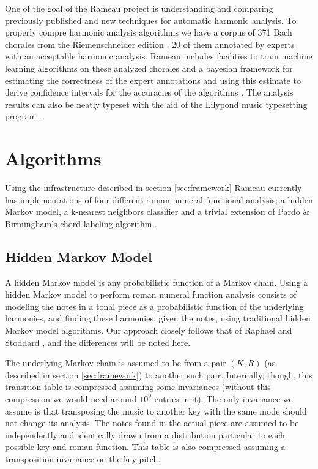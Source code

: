 
One of the goal of the Rameau project is understanding and comparing
previously published and new techniques for automatic harmonic
analysis. To properly compre harmonic analysis algorithms we have a
corpus of 371 Bach chorales from the Riemenschneider edition
\cite{bach41:371}, 20 of them annotated by experts with an acceptable
harmonic analysis. Rameau includes facilities to train machine
learning algorithms on these analyzed chorales and a bayesian
framework for estimating the correctness of the expert annotations and
using this estimate to derive confidence intervals for the accuracies
of the algorithms . The analysis results can
also be neatly typeset with the aid of the Lilypond music typesetting
program \cite{nienhuys.ea08:lilypond}.

\section{Algorithms}
\label{sec:algorithms}

Using the infrastructure described in section \ref{sec:framework}
Rameau currently has implementations of four different roman numeral
functional analysis; a hidden Markov model, a k-nearest neighbors
classifier and a trivial extension of Pardo \& Birmingham's chord
labeling algorithm \cite{pardo.ea99:automated}.

\subsection{Hidden Markov Model}
\label{sec:hidden-markov-model}

A hidden Markov model is any probabilistic function of a Markov
chain. Using a hidden Markov model to perform roman numeral function
analysis consists of modeling the notes in a tonal piece as a
probabilistic function of the underlying harmonies, and finding these
harmonies, given the notes, using traditional hidden Markov model
algorithms. Our approach closely follows that of Raphael and Stoddard
\cite{raphael.ea03:harmonic}, and the differences will be noted here.

The underlying Markov chain is assumed to be from a pair $(K,R)$ (as
described in section \ref{sec:framework}) to another such
pair. Internally, though, this transition table is compressed assuming
some invariances (without this compression we would need around $10^9$
entries in it). The only invariance we assume is that transposing the
music to another key with the same mode should not change its
analysis. The notes found in the actual piece are assumed to be
independently and identically drawn from a distribution particular to
each possible key and roman function. This table is also compressed
assuming a transposition invariance on the key pitch. 

